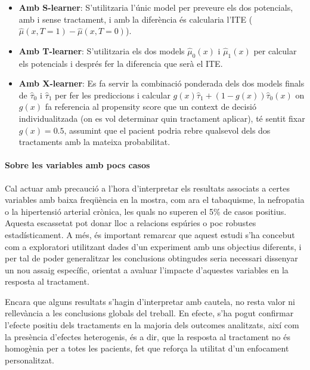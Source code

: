\documentclass[../main.tex]{subfiles}
\begin{document}
    \begin{itemize}
        \item \textbf{Amb S-learner}: S'utilitzaria l'únic model per preveure els dos potencials, amb i sense tractament,  i amb la diferència és calcularia l'ITE ($\hat{\mu}(x,T=1)-\hat{\mu}(x,T=0)$).
        \item \textbf{Amb T-learner}: S'utilitzaria els dos models $\hat\mu_0(x)$ i $\hat\mu_1(x)$ per calcular els potencials i després fer la diferencia que serà el ITE.
        \item \textbf{Amb X-learner}: Es fa servir la combinació ponderada dels dos models finals de $\hat\tau_0$ i $\hat\tau_1$ per fer les prediccions i calcular $g(x)\hat\tau_1+(1-g(x))\hat\tau_0(x)$ on $g(x)$ fa referencia al propensity score que un context de decisió individualitzada (on es vol determinar quin tractament aplicar), té sentit fixar $g(x) = 0.5$, assumint que el pacient podria rebre qualsevol dels dos tractaments amb la mateixa probabilitat.
    \end{itemize}

    \FloatBarrier
    \paragraph{Sobre les variables amb pocs casos} Cal actuar amb precaució a l’hora d’interpretar els resultats associats a certes variables amb baixa freqüència en la mostra, com ara el tabaquisme, la nefropatia o la hipertensió arterial crònica, les quals no superen el 5\% de casos positius. Aquesta escassetat pot donar lloc a relacions espúries o poc robustes estadísticament. A més, és important remarcar que aquest estudi s’ha concebut com a exploratori utilitzant dades d'un experiment amb uns objectius diferents, i per tal de poder generalitzar les conclusions obtingudes seria necessari dissenyar un nou assaig específic, orientat a avaluar l’impacte d’aquestes variables en la resposta al tractament.\par
    Encara que alguns resultats s’hagin d’interpretar amb cautela, no resta valor ni rellevància a les conclusions globals del treball. En efecte, s’ha pogut confirmar l’efecte positiu dels tractaments en la majoria dels outcomes analitzats, així com la presència d’efectes heterogenis, és a dir, que la resposta al tractament no és homogènia per a totes les pacients, fet que reforça la utilitat d’un enfocament personalitzat.
    
\end{document}
